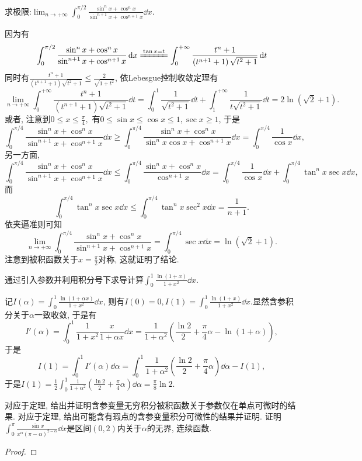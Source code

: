 \begin{quiza}
\woe 求极限:\(\lim_{n\rightarrow+\infty}\int_{0}^{\pi/2}\frac{\sin^n x+\cos^nx}{\sin^{n+1}x+\cos^{n+1}x}\dd x.\)
\begin{solution}
因为有\[\int_{0}^{\pi/2}\frac{\sin^n x+\cos^nx}{\sin^{n+1}x+\cos^{n+1}x}\dd x\xlongequal{\tan x=t}\int_{0}^{+\infty}\frac{t^n+1}{\left(t^{n+1}+1\right)\sqrt{t^2+1}}\dd t\]同时有\(\frac{t^n+1}{\left(t^{n+1}+1\right)\sqrt{t^2+1}}\leqslant\frac{2}{\sqrt{1+t^2}}\), 依Lebesgue控制收敛定理有\[\lim_{n\rightarrow+\infty}\int_{0}^{+\infty}\frac{t^n+1}{\left(t^{n+1}+1\right)\sqrt{t^2+1}}\dd t=\int_{0}^{1}\frac{1}{\sqrt{t^2+1}}\dd t+\int_{1}^{+\infty}\frac{1}{t\sqrt{t^2+1}}\dd t=2\ln(\sqrt{2}+1).\]
或者, 注意到\(0\leqslant x\leqslant\frac{\pi}{4},\) 有\(0\leqslant \sin x\leqslant\cos x\leqslant 1,\sec x\geqslant 1\), 于是\[\int_{0}^{\pi/4}\frac{\sin^nx+\cos^nx}{\sin^{n+1}x+\cos^{n+1}x}\dd x\geqslant\int_{0}^{\pi/4}\frac{\sin^nx+\cos^nx}{\sin^nx\cos x+\cos^{n+1}x}\dd x=\int_{0}^{\pi/4}\frac{1}{\cos x}\dd x,\]另一方面,\[
\int_{0}^{\pi/4}\frac{\sin^nx+\cos^nx}{\sin^{n+1}x+\cos^{n+1}x}\dd x\leqslant\int_{0}^{\pi/4}\frac{\sin^nx+\cos^nx}{\cos^{n+1}x}\dd x=\int_{0}^{\pi/4}\frac{1}{\cos x}\dd x+\int_{0}^{\pi/4}\tan^nx\sec x\dd x,\]而\[\int_{0}^{\pi/4}\tan^nx\sec x\dd x\leqslant\int_{0}^{\pi/4}\tan^nx\sec^2 x\dd x=\frac{1}{n+1}.\]依夹逼准则可知\[\lim_{n\rightarrow+\infty}\int_{0}^{\pi/4}\frac{\sin^nx+\cos^nx}{\sin^{n+1}x+\cos^{n+1}x}=\int_{0}^{\pi/4}\sec x\dd x=\ln(\sqrt{2}+1).\]注意到被积函数关于\(x=\frac{\pi}{2}\)对称, 这就证明了结论. 
\end{solution}
\woe 通过引入参数并利用积分号下求导计算\(\int_{0}^{1}\frac{\ln (1+x)}{1+x^2}\dd x\).
\begin{solution}
记\(I(\alpha)=\int_{0}^{1}\frac{\ln(1+\alpha x)}{1+x^2}\dd x\), 则有\(I(0)=0, I(1)=\int_{0}^{1}\frac{\ln(1+x)}{1+x^2}\dd x.\)显然含参积分关于\(\alpha\)一致收敛, 于是有\[I'(\alpha)=\int_{0}^{1}\frac{1}{1+x^2}\frac{x}{1+\alpha x}\dd x=\frac{1}{1+\alpha^2}\left(\frac{\ln 2}{2}+\frac{\pi}{4}\alpha-\ln(1+\alpha)\right),\]于是\[I(1)=\int_{0}^{1}I'(\alpha)\dd \alpha=\int_{0}^{1}\frac{1}{1+\alpha^2}\left(\frac{\ln 2}{2}+\frac{\pi}{4}\alpha\right)\dd \alpha-I(1),\]于是\(I(1)=\frac{1}{2}\int_{0}^{1}\frac{1}{1+\alpha^2}\left(\frac{\ln 2}{2}+\frac{\pi}{4}\alpha\right)\dd\alpha=\frac{\pi}{8}\ln 2.\)
\end{solution}
\woe 对应于定理, 给出并证明含参变量无穷积分被积函数关于参数仅在单点可微时的结果.
\woe 对应于定理, 给出可能含有瑕点的含参变量积分可微性的结果并证明.
\woe 证明\(\int_{0}^{\pi}\frac{\sin x}{x^\alpha(\pi-\alpha)^{2-\alpha}}\dd x\)是区间\((0,2)\)内关于\(\alpha\)的无界, 连续函数.
\begin{proof}


\end{proof}
\end{quiza}

